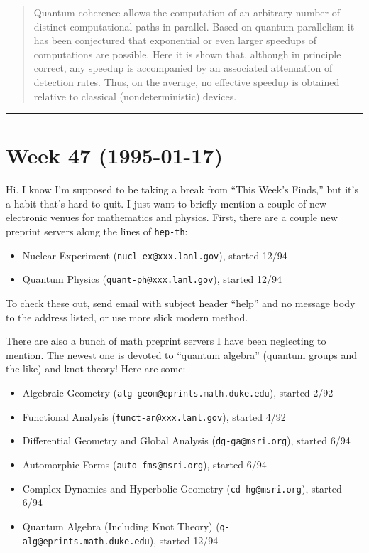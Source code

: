 \documentclass{article}
\def\tightlist{}
\begin{document}
\begin{quote}
Quantum coherence allows the computation of an arbitrary number of
distinct computational paths in parallel. Based on quantum parallelism
it has been conjectured that exponential or even larger speedups of
computations are possible. Here it is shown that, although in principle
correct, any speedup is accompanied by an associated attenuation of
detection rates. Thus, on the average, no effective speedup is obtained
relative to classical (nondeterministic) devices.
\end{quote}

\begin{center}\rule{0.5\linewidth}{0.5pt}\end{center}
\hypertarget{week-47-1995-01-17}{%
\section{Week 47 (1995-01-17)}\label{week-47-1995-01-17}}

Hi. I know I'm supposed to be taking a break from ``This Week's Finds,''
but it's a habit that's hard to quit. I just want to briefly mention a
couple of new electronic venues for mathematics and physics. First,
there are a couple new preprint servers along the lines of
\texttt{hep-th}:

\begin{itemize}
\tightlist
\item
  Nuclear Experiment (\texttt{nucl-ex@xxx.lanl.gov}), started 12/94
\item
  Quantum Physics (\texttt{quant-ph@xxx.lanl.gov}), started 12/94
\end{itemize}

To check these out, send email with subject header ``help'' and no
message body to the address listed, or use more slick modern method.

There are also a bunch of math preprint servers I have been neglecting
to mention. The newest one is devoted to ``quantum algebra'' (quantum
groups and the like) and knot theory! Here are some:

\begin{itemize}
\tightlist
\item
  Algebraic Geometry (\texttt{alg-geom@eprints.math.duke.edu}), started
  2/92
\item
  Functional Analysis (\texttt{funct-an@xxx.lanl.gov}), started 4/92
\item
  Differential Geometry and Global Analysis (\texttt{dg-ga@msri.org}),
  started 6/94
\item
  Automorphic Forms (\texttt{auto-fms@msri.org}), started 6/94
\item
  Complex Dynamics and Hyperbolic Geometry (\texttt{cd-hg@msri.org}),
  started 6/94
\item
  Quantum Algebra (Including Knot Theory)
  (\texttt{q-alg@eprints.math.duke.edu}), started 12/94
\end{itemize}
\end{document}
